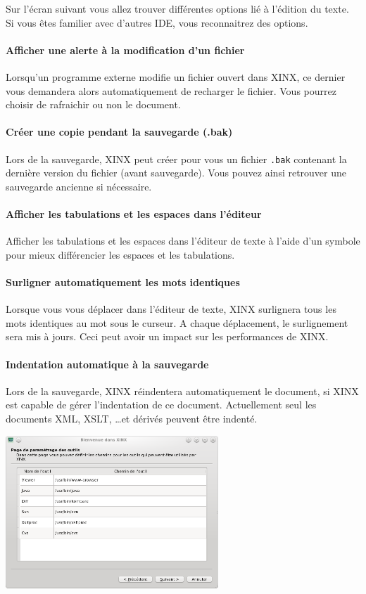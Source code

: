 \documentclass[a4paper,10pt,twoside]{book}
\begin{document}
Sur l'écran suivant vous allez trouver différentes options lié à l'édition du texte. Si vous êtes familier avec d'autres IDE, vous reconnaitrez des options. 

\paragraph{Afficher une alerte à la modification d'un fichier} Lorsqu'un programme externe modifie un fichier ouvert dans XINX, ce dernier vous demandera alors automatiquement de recharger le fichier. Vous pourrez choisir de rafraichir ou non le document.

\paragraph{Créer une copie pendant la sauvegarde (.bak)} Lors de la sauvegarde, XINX peut créer pour vous un fichier \verb+.bak+ contenant la dernière version du fichier (avant sauvegarde). Vous pouvez ainsi retrouver une sauvegarde ancienne si nécessaire.

\paragraph{Afficher les tabulations et les espaces dans l'éditeur} Afficher les tabulations et les espaces dans l'éditeur de texte à l'aide d'un symbole pour mieux différencier les espaces et les tabulations.

\paragraph{Surligner automatiquement les mots identiques} Lorsque vous vous déplacer dans l'éditeur de texte, XINX surlignera tous les mots identiques au mot sous le curseur. A chaque déplacement, le surlignement sera mis à jours. Ceci peut avoir un impact sur les performances de XINX.

\paragraph{Indentation automatique à la sauvegarde} Lors de la sauvegarde, XINX réindentera automatiquement le document, si XINX est capable de gérer l'indentation de ce document. Actuellement seul les documents XML, XSLT, \dots et dérivés peuvent être indenté.

\begin{center}
 \includegraphics[width=0.60\textwidth]{./firstinstall4.png}
\end{center}
\end{document}

